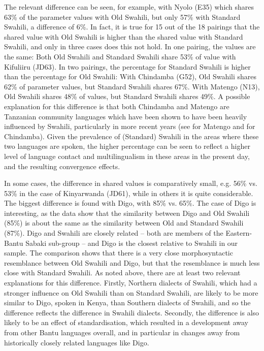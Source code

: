 \documentclass[output=paper]{langscibook}
\begin{document}
The relevant difference can be seen, for example, with Nyolo (E35) which shares 63\% of the parameter values with Old Swahili, but only 57\% with Standard Swahili, a difference of 6\%. In fact, it is true for 15 out of the 18 pairings that the shared value with Old Swahili is higher than the shared value with Standard Swahili, and only in three cases does this not hold. In one pairing, the values are the same: Both Old Swahili and Standard Swahili share 53\% of value with Kifuliiru (JD63). In two pairings, the percentage for Standard Swahili is higher than the percentage for Old Swahili: With Chindamba (G52), Old Swahili shares 62\% of parameter values, but Standard Swahili shares 67\%. With Matengo (N13), Old Swahili shares 48\% of values, but Standard Swahili shares 49\%. A possible explanation for this difference is that both Chindamba and Matengo are Tanzanian community languages which have been shown to have been heavily influenced by Swahili, particularly in more recent years (see \citealt{Yoneda2010, KutsukakeYoneda2019} for Matengo and \citealt{EldestenLijongwa2010} for Chindamba). Given the prevalence of (Standard) Swahili in the areas where these two languages are spoken, the higher percentage can be seen to reflect a higher level of language contact and multilingualism in these areas in the present day, and the resulting convergence effects.

In some cases, the difference in shared values is comparatively small, e.g. 56\% vs. 53\% in the case of Kinyarwanda (JD61), while in others it is quite considerable. The biggest difference is found with Digo, with 85\% vs. 65\%. The case of Digo is interesting, as the data show that the similarity between Digo and Old Swahili (85\%) is about the same as the similarity between Old and Standard Swahili (87\%). Digo and Swahili are closely related -- both are members of the Eastern-Bantu Sabaki sub-group -- and Digo is the closest relative to Swahili in our sample. The comparison shows that there is a very close morphosyntactic resemblance between Old Swahili and Digo, but that the resemblance is much less close with Standard Swahili. As noted above, there are at least two relevant explanations for this difference. Firstly, Northern dialects of Swahili, which had a stronger influence on Old Swahili than on Standard Swahili, are likely to be more similar to Digo, spoken in Kenya, than Southern dialects of Swahili, and so the difference reflects the difference in Swahili dialects. Secondly, the difference is also likely to be an effect of standardisation, which resulted in a development away from other Bantu languages overall, and in particular in changes away from historically closely related languages like Digo. 
\end{document}
